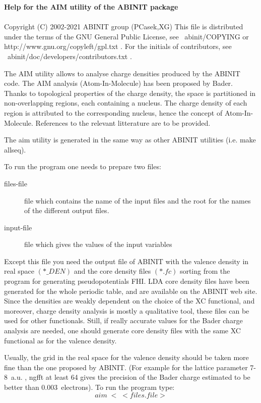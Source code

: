 \documentclass[11pt]{article}
\begin{document}
{\Huge \bf Help for the AIM utility of the ABINIT package} \\ \\

     Copyright (C) 2002-2021 ABINIT group (PCasek,XG)
     This file is distributed under the terms of the
     GNU General Public License, see ~abinit/COPYING
     or http://www.gnu.org/copyleft/gpl.txt .
     For the initials of contributors, see ~abinit/doc/developers/contributors.txt .

The AIM utility allows to analyse charge densities
produced by the ABINIT code. The AIM analysis (Atom-In-Molecule)
has been proposed by Bader. Thanks to topological
properties of the charge density, the space is partitioned
in non-overlapping regions, each containing a nucleus.
The charge density of each region is attributed to the
corresponding nucleus, hence the concept of Atom-In-Molecule.
References to the relevant litterature are to be provided.

The aim utility is generated in the same way as other
ABINIT utilities (i.e. make allseq).

To run the program one needs to prepare two files:
\begin{description}
\item [files-file] file which contains the name of the input files and the
root for the names of the different output files.
\item [input-file] file which gives the values of the input variables
\end{description}
Except this file you need the output file of ABINIT with the valence
density in real space $(*\_DEN)$ and the core density files $(*.fc)$ sorting
from the program for generating pseudopotentials FHI.
LDA core density files have been generated for the
whole periodic table, and are available on the ABINIT web site.
Since the densities are weakly dependent on the choice of the
XC functional, and moreover, charge density analysis
is mostly a qualitative tool, these files can be used
for other functionals. Still, if really accurate
values for the Bader charge analysis are needed, one should
generate core density files with the same XC functional as
for the valence density.

Usually, the grid in the real space for the valence density should be
taken more fine than the one proposed by ABINIT.
(For example for the lattice parameter 7-8~a.u. , ngfft at least 64
gives the precision of the Bader charge estimated to be better
than 0.003~electrons).
To run the program type: $$aim\; < \; <files.file> $$
\end{document}
